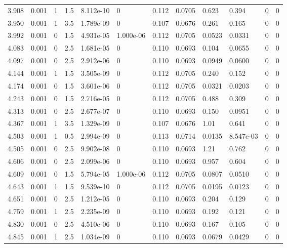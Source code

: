 \documentclass[preview]{standalone}
\begin{document}
{{{\begin{tabular}{L{1.2cm}C{1.2cm} C{0.3cm}C{0.5cm} C{1.4cm}C{1.4cm} C{1.4cm}C{1.4cm} C{1.6cm}C{1.6cm} C{1.6cm}C{1.6cm}}
  3.908  &  0.001  & 1     & 1.5 &  8.112e-10  & 0  &  0.112&   0.0705& 0.623 & 0.394   &  0 & 0  \\ 
  3.950  &  0.001  & 1     & 3.5 &  1.789e-09  & 0  &  0.107&   0.0676& 0.261 & 0.165   &  0 & 0  \\ 
  3.992  &  0.001  & 0     & 1.5 &  4.931e-05  & 1.000e-06  &  0.112&   0.0705& 0.0523 & 0.0331   &  0 & 0  \\ 
  4.083  &  0.001  & 0     & 2.5 &  1.681e-05  & 0  &  0.110&   0.0693& 0.104 & 0.0655   &  0 & 0  \\ 
  4.097  &  0.001  & 0     & 2.5 &  2.912e-06  & 0  &  0.110&   0.0693& 0.0949 & 0.0600   &  0 & 0  \\ 
  4.144  &  0.001  & 1     & 1.5 &  3.505e-09  & 0  &  0.112&   0.0705& 0.240 & 0.152   &  0 & 0  \\ 
  4.174  &  0.001  & 0     & 1.5 &  3.601e-06  & 0  &  0.112&   0.0705& 0.0321 & 0.0203   &  0 & 0  \\ 
  4.243  &  0.001  & 0     & 1.5 &  2.716e-05  & 0  &  0.112&   0.0705& 0.488 & 0.309   &  0 & 0  \\ 
  4.313  &  0.001  & 0     & 2.5 &  2.677e-07  & 0  &  0.110&   0.0693& 0.150 & 0.0951   &  0 & 0  \\ 
  4.367  &  0.001  & 1     & 3.5 &  1.329e-09  & 0  &  0.107&   0.0676& 1.01 & 0.641   &  0 & 0  \\ 
  4.503  &  0.001  & 1     & 0.5 &  2.994e-09  & 0  &  0.113&   0.0714& 0.0135 & 8.547e-03   &  0 & 0  \\ 
  4.505  &  0.001  & 0     & 2.5 &  9.902e-08  & 0  &  0.110&   0.0693& 1.21 & 0.762   &  0 & 0  \\ 
  4.606  &  0.001  & 0     & 2.5 &  2.099e-06  & 0  &  0.110&   0.0693& 0.957 & 0.604   &  0 & 0  \\ 
  4.609  &  0.001  & 0     & 1.5 &  5.794e-05  & 1.000e-06  &  0.112&   0.0705& 0.0807 & 0.0510   &  0 & 0  \\ 
  4.643  &  0.001  & 1     & 1.5 &  9.539e-10  & 0  &  0.112&   0.0705& 0.0195 & 0.0123   &  0 & 0  \\ 
  4.651  &  0.001  & 0     & 2.5 &  1.212e-05  & 0  &  0.110&   0.0693& 0.204 & 0.129   &  0 & 0  \\ 
  4.759  &  0.001  & 1     & 2.5 &  2.235e-09  & 0  &  0.110&   0.0693& 0.192 & 0.121   &  0 & 0  \\ 
  4.830  &  0.001  & 0     & 2.5 &  4.510e-06  & 0  &  0.110&   0.0693& 0.167 & 0.105   &  0 & 0  \\ 
  4.845  &  0.001  & 1     & 2.5 &  1.034e-09  & 0  &  0.110&   0.0693& 0.0679 & 0.0429   &  0 & 0  \\ 

\end{tabular}}}}
\end{document}
